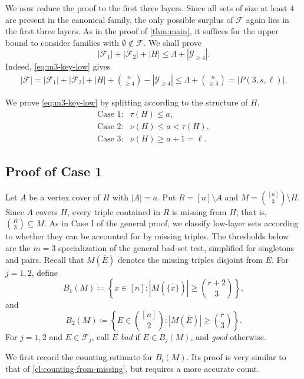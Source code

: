 \documentclass[10pt,a4paper]{article}
\numberwithin{equation}{section}
\theoremstyle{definition}
\newcommand{\F}{\mathcal F}
\newcommand{\Y}{\mathcal Y}
\begin{document}
We now reduce the proof to the first three layers.  Since all sets of size at
least $4$ are present in the canonical family, the only possible surplus of
\(\F\) again lies in the first three layers.
As in the proof of \cref{thm:main}, it suffices for the upper bound to
consider families with \(\emptyset\notin\F\).  We shall prove
\begin{equation}\label{eq:m3-key-low}
    |\F_1|+|\F_2|+|H|
    \le
    \Lambda+|\Y_{\ge4}|.
\end{equation}
Indeed, \eqref{eq:m3-key-low} gives
\[
    \begin{aligned}
        |\F|=
        |\F_1|+|\F_2|+|H|+\binom n{\ge4}-|\Y_{\ge4}| \le
        \Lambda+\binom n{\ge4}
        =
        |P(3,s,\ell)|.
    \end{aligned}
\]

We prove \eqref{eq:m3-key-low} by splitting according to the structure of  \(H\).
\[
    \begin{array}{ll}
        \text{Case 1:} & \tau(H)\le a,        \\[1mm]
        \text{Case 2:} & \nu(H)\le a<\tau(H), \\[1mm]
        \text{Case 3:} & \nu(H)\ge a+1=\ell .
    \end{array}
\]

\subsection{Proof of Case 1}

Let \(A\) be a vertex cover of \(H\) with \(|A|=a\).  Put
\(R=[n]\setminus A\) and \(M=\binom{[n]}3\setminus H\).
Since \(A\) covers \(H\), every triple contained in \(R\) is missing from
\(H\); that is,
\(\binom R3\subseteq M.\)
As in Case I of the general proof, we classify low-layer sets according to
whether they can be accounted for by missing triples.  The thresholds below are
the $m=3$ specialization of the general bad-set test, simplified for
singletons and pairs.  Recall that \(M(\overline E)\) denotes the missing triples disjoint from \(E\).
For \(j=1,2\), define
\[
    B_1(M)
    \coloneqq
    \left\{x\in[n]: |M(\overline{\{x\}})|\ge \binom{r+2}{3}\right\},
\]
and
\[
    B_2(M)
    \coloneqq
    \left\{E\in\binom{[n]}2: |M(\overline E)|\ge \binom r3\right\}.
\]
For \(j=1,2\) and \(E\in\F_j\), call \(E\) \emph{bad} if
\(E\in B_j(M)\), and \emph{good} otherwise.

We first record the counting estimate for $B_i(M)$.
Its proof is very similar to that of \cref{cl:counting-from-missing}, but requires a more accurate count.
\end{document}
